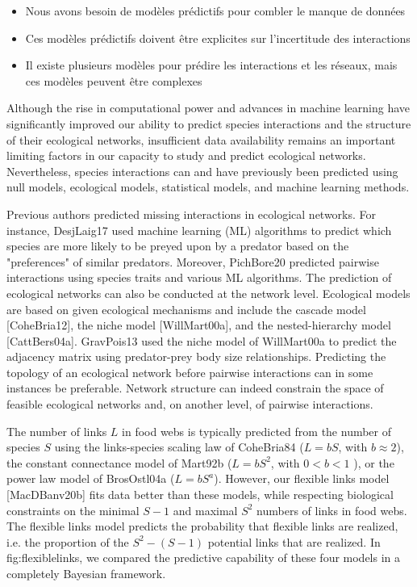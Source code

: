 \begin{itemize}
    \item Nous avons besoin de modèles prédictifs pour combler le manque de données 
    \item Ces modèles prédictifs doivent être explicites sur l'incertitude des interactions
    \item Il existe plusieurs modèles pour prédire les interactions et les réseaux, mais ces modèles peuvent être complexes
\end{itemize}

Although the rise in computational power and advances in machine learning have
significantly improved our ability to predict species interactions and the
structure of their ecological networks, insufficient data availability remains
an important limiting factors in our capacity to study and predict ecological
networks. Nevertheless, species interactions can and have previously been
predicted using null models, ecological models, statistical models, and machine
learning methods.

Previous authors predicted missing interactions in ecological networks. For
instance, DesjLaig17 used machine learning (ML) algorithms to predict which
species are more likely to be preyed upon by a predator based on the
"preferences" of similar predators. Moreover, PichBore20 predicted pairwise
interactions using species traits and various ML algorithms. The prediction of
ecological networks can also be conducted at the network level. Ecological
models are based on given ecological mechanisms and include the cascade model
[CoheBria12], the niche model [WillMart00a], and the nested-hierarchy model
[CattBers04a]. GravPois13 used the niche model of WillMart00a to predict the
adjacency matrix using predator-prey body size relationships. Predicting the
topology of an ecological network before pairwise interactions can in some
instances be preferable. Network structure can indeed constrain the space of
feasible ecological networks and, on another level, of pairwise interactions.

The number of links $L$ in food webs is typically predicted from the number of
species $S$ using the links-species scaling law of CoheBria84 ($L=bS$, with
$b\approx 2$), the constant connectance model of Mart92b ($L=bS^2$, with $0 < b
< 1$ ), or the power law model of BrosOstl04a ($L=bS^a$). However, our flexible
links model [MacDBanv20b] fits data better than these models, while respecting
biological constraints on the minimal $S-1$ and maximal $S^2$ numbers of links
in food webs. The flexible links model predicts the probability that flexible
links are realized, i.e. the proportion of the $S^2 - (S-1)$ potential links
that are realized. In fig:flexiblelinks, we compared the predictive capability
of these four models in a completely Bayesian framework.  

